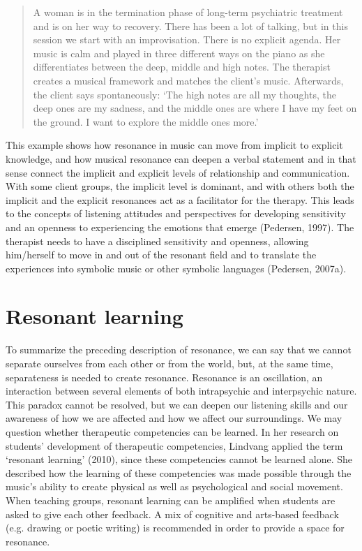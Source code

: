 \begin{adjmulticols}{2}{0mm}{0mm}
    \blockquote{A woman is in the termination phase of long-term psychiatric treatment and is on her way to recovery. There has been a lot of talking, but in this session we start with an improvisation. There is no explicit agenda. Her music is calm and played in three different ways on the piano as she differentiates between the deep, middle and high notes. The therapist creates a musical framework and matches the client’s music. Afterwards, the client says spontaneously: ‘The high notes are all my thoughts, the deep ones are my sadness, and the middle ones are where I have my feet on the ground. I want to explore the middle ones more.'}
This example shows how resonance in music can move from implicit to explicit knowledge, and how musical resonance can deepen a verbal statement and in that sense connect the implicit and explicit levels of relationship and communication. With some client groups, the implicit level is dominant, and with others both the implicit and the explicit resonances act as a facilitator for the therapy. This leads to the concepts of listening attitudes and perspectives for developing sensitivity and an openness to experiencing the emotions that emerge (Pedersen, 1997). The therapist needs to have a disciplined sensitivity and openness, allowing him/herself to move in and out of the resonant field and to translate the experiences into symbolic music or other symbolic languages (Pedersen, 2007a).

\section{Resonant learning}
To summarize the preceding description of resonance, we can say that we cannot separate ourselves from each other or from the world, but, at the same time, separateness is needed to create resonance. Resonance is an oscillation, an interaction between several elements of both intrapsychic and interpsychic nature. This paradox cannot be resolved, but we can deepen our listening skills and our awareness of how we are affected and how we affect our surroundings. We may question whether therapeutic competencies can be learned. In her research on students’ development of therapeutic competencies, Lindvang applied the term ‘resonant learning’ (2010), since these competencies cannot be learned alone. She described how the learning of these competencies was made possible through the music’s ability to create physical as well as psychological and social movement. When teaching groups, resonant learning can be amplified when students are asked to give each other feedback. A mix of cognitive and arts-based feedback (e.g. drawing or poetic writing) is recommended in order to provide a space for resonance.


\end{adjmulticols}
